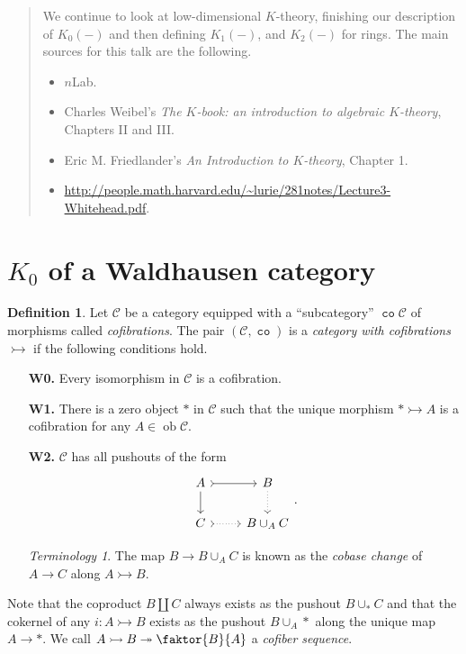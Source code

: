 \documentclass[10pt,letterpaper,cm]{nupset}
\theoremstyle{definition}
\newtheorem{definition}{Definition}[section]
\theoremstyle{theorem}
\theoremstyle{remark}
\newtheorem*{term}{Terminology}
\newcommand{\1}{\mathbf{1}}
\renewcommand{\c}{\mathscr{C}}
\newcommand{\0}{\vec 0}
\DeclareMathOperator{\ob}{ob}
\DeclareMathOperator{\co}{\mathtt{co}}
\begin{document}
\begin{abstract}
We continue to look at low-dimensional $K$-theory, finishing our description of $K_0(-)$ and then defining $K_1(-)$, and $K_2(-)$ for rings. The main sources for this talk are the following.
\begin{itemize}
\item $n$Lab.
\item Charles Weibel's \textit{The $K$-book: an introduction to algebraic $K$-theory}, Chapters II and III.
\item Eric M. Friedlander's \textit{An Introduction to $K$-theory}, Chapter 1.
\item \url{http://people.math.harvard.edu/~lurie/281notes/Lecture3-Whitehead.pdf}.
\end{itemize}
\end{abstract}

\smallskip

\section{$K_0$ of a Waldhausen category}

\begin{definition}
Let $\c$ be a category equipped with a ``subcategory'' $\co{\c}$ of morphisms called \textit{cofibrations}. The pair $\left(\c, \co\right)$ is a \textit{category with cofibrations $\rightarrowtail$} if the following conditions hold.
\begin{itemize}
\item[\textbf{W0.}] Every isomorphism in $\c$ is a cofibration.
\item[\textbf{W1.}] There is a zero object $\ast$ in $\c$ such that the unique morphism $\ast \rightarrowtail A$ is a cofibration for any $A \in \ob \c$.
\item[\textbf{W2.}] $\c$ has all pushouts of the form
\[
\begin{tikzcd}
A \arrow[d] \arrow[r, tail] & B \arrow[d, dotted] \\
C \arrow[r, dotted, tail] & B \cup_A C
\end{tikzcd}.
\]
\begin{term}
The map $B \to B\cup_{A} C$ is known as the \textit{cobase change} of $A \to C$ along $A \rightarrowtail B$.
 \end{term}
\end{itemize}
\end{definition}


Note that the coproduct $B \coprod C$ always exists as the pushout $B \cup_{\ast} C$ and that the cokernel of any $i : A \rightarrowtail B$ exists as the pushout $B \cup_A \ast$ along the unique map $A \to \ast$. We call $A \rightarrowtail  B \twoheadrightarrow \faktor{B}{A}$ a \textit{cofiber sequence}.
\end{document}
